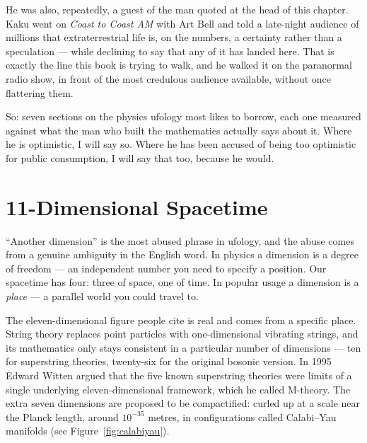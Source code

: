 He was also, repeatedly, a guest of the man quoted at the head of this chapter. Kaku went on
\emph{Coast to Coast AM} with Art Bell and told a late-night audience of millions that
extraterrestrial life is, on the numbers, a certainty rather than a speculation --- while declining
to say that any of it has landed here. That is exactly the line this book is trying to walk, and
he walked it on the paranormal radio show, in front of the most credulous audience available,
without once flattering them. 

So: seven sections on the physics ufology most likes to borrow, each one measured against what the
man who built the mathematics actually says about it. Where he is optimistic, I will say so. Where
he has been accused of being too optimistic for public consumption, I will say that too, because
he would.

\section{11-Dimensional Spacetime}\label{sec:11dimensionalspacetime}

``Another dimension'' is the most abused phrase in ufology, and the abuse comes from a genuine
ambiguity in the English word. In physics a dimension is a degree of freedom --- an independent
number you need to specify a position. Our spacetime has four: three of space, one of time. In
popular usage a dimension is a \emph{place} --- a parallel world you could travel to. 

The eleven-dimensional figure people cite is real and comes from a specific place. String theory
replaces point particles with one-dimensional vibrating strings, and its mathematics only stays
consistent in a particular number of dimensions --- ten for superstring theories, twenty-six for
the original bosonic version. In 1995 Edward Witten argued that the five known superstring
theories were limits of a single underlying eleven-dimensional framework, which he called
M-theory. The extra seven dimensions are proposed to be compactified: curled up at a scale near
the Planck length, around $10^{-35}$ metres, in configurations called Calabi--Yau manifolds (see Figure~\ref{fig:calabiyau}).

